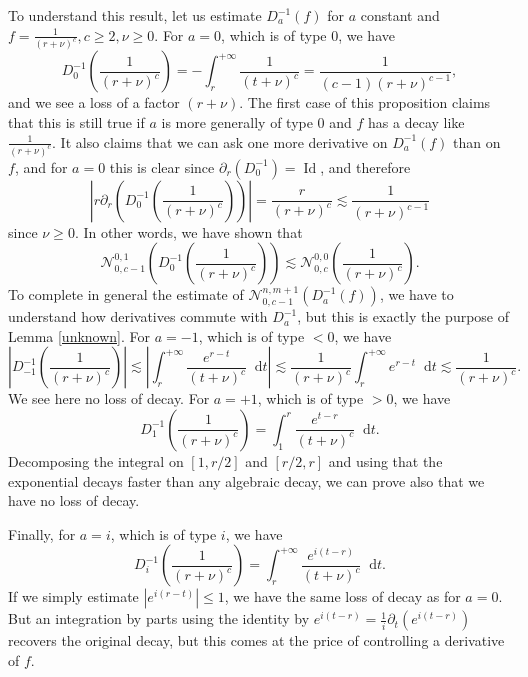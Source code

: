 \documentclass[11 pt]{amsart}
\newcommand{\tmop}[1]{\ensuremath{\operatorname{#1}}}
\theoremstyle{definition}
\theoremstyle{remark}
\numberwithin{equation}{section}
\newcommand{\dd}{\mathop{}\!\mathrm{d}}
\begin{document}
To understand this result, let us estimate $D_a^{- 1} (f)$ for $a$ constant
and $f = \frac{1}{(r + \nu)^c}, c \geqslant 2, \nu \geqslant 0$. For $a = 0$,
which is of type $0$, we have
\[ D_0^{- 1} \left( \frac{1}{(r + \nu)^c} \right) = - \int_r^{+ \infty}
   \frac{1}{(t + \nu)^c} = \frac{1}{(c - 1) (r + \nu)^{c - 1}}, \]
and we see a loss of a factor $(r + \nu)$. The first case of this proposition
claims that this is still true if $a$ is more generally of type $0$ and $f$
has a decay like $\frac{1}{(r + \nu)^c}$. It also claims that we can ask one
more derivative on $D_a^{- 1} (f)$ than on $f$, and for $a = 0$ this is clear
since $\partial_r (D_0^{- 1}) = \tmop{Id}$, and therefore
\[ \left| r \partial_r \left( D_0^{- 1} \left( \frac{1}{(r + \nu)^c} \right)
   \right) \right| = \frac{r}{(r + \nu)^c} \lesssim \frac{1}{(r + \nu)^{c -
   1}} \]
since $\nu \geqslant 0$. In other words, we have shown that
\[ \mathcal{N}_{0, c - 1}^{0, 1} \left( D_0^{- 1} \left( \frac{1}{(r + \nu)^c}
   \right) \right) \lesssim \mathcal{N}_{0, c}^{0, 0} \left( \frac{1}{(r +
   \nu)^c} \right) . \]
To complete in general the estimate of $\mathcal{N}_{0, c - 1}^{n, m+1} \left( D_a^{- 1}\left( f
   \right) \right)$, we have to understand how derivatives commute with $D_a^{- 1}$, but this is exactly the purpose of Lemma \ref{unknown}.
For $a = - 1$, which is of type $< 0$, we have
\[ \left| D_{- 1}^{- 1} \left( \frac{1}{(r + \nu)^c} \right) \right| \lesssim
   \left| \int_r^{+ \infty} \frac{e^{r - t}}{(t + \nu)^c}\dd t \right| \lesssim
   \frac{1}{(r + \nu)^c} \int_r^{+ \infty} e^{r - t}\dd t \lesssim \frac{1}{(r
   + \nu)^c} . \]
We see here no loss of decay. For $a = + 1$, which is of type $> 0$, we have
\[ D_1^{- 1} \left( \frac{1}{(r + \nu)^c} \right) = \int_1^r \frac{e^{t -
   r}}{(t + \nu)^c}\dd t. \]
Decomposing the integral on $[1, r / 2]$ and $[r / 2, r]$ and using that the
exponential decays faster than any algebraic decay, we can prove also that we
have no loss of decay.

Finally, for $a = i$, which is of type $i$, we have
\[ D_i^{- 1} \left( \frac{1}{(r + \nu)^c} \right) = \int_r^{+ \infty}
   \frac{e^{i (t - r)}}{(t + \nu)^c}\dd t. \]
If we simply estimate $| e^{i (r - t)} | \leqslant 1$, we have the same loss of decay
as for $a = 0$. But an integration by parts using the identity by 
$e^{i (t - r)} = \frac{1}{i} \partial_t (e^{i (t - r)})$ recovers the original decay, but this comes at the price of controlling a derivative of $f$.
\end{document}
